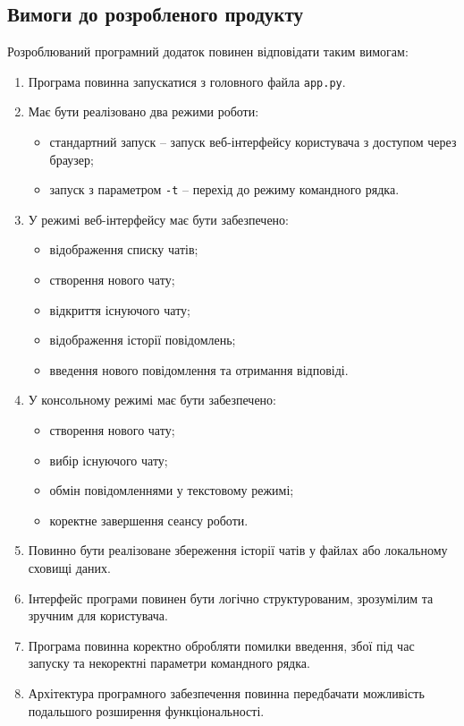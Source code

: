 \documentclass[12pt,a4paper]{article}
\begin{document}
    \subsection{Вимоги до розробленого продукту}

    Розроблюваний програмний додаток повинен відповідати таким вимогам:

    \begin{enumerate}
        \item Програма повинна запускатися з головного файла \texttt{app.py}.
        \item Має бути реалізовано два режими роботи:
        \begin{itemize}
            \item стандартний запуск -- запуск веб-інтерфейсу користувача з доступом через браузер;
            \item запуск з параметром \texttt{-t} -- перехід до режиму командного рядка.
        \end{itemize}
        \item У режимі веб-інтерфейсу має бути забезпечено:
        \begin{itemize}
            \item відображення списку чатів;
            \item створення нового чату;
            \item відкриття існуючого чату;
            \item відображення історії повідомлень;
            \item введення нового повідомлення та отримання відповіді.
        \end{itemize}
        \item У консольному режимі має бути забезпечено:
        \begin{itemize}
            \item створення нового чату;
            \item вибір існуючого чату;
            \item обмін повідомленнями у текстовому режимі;
            \item коректне завершення сеансу роботи.
        \end{itemize}
        \item Повинно бути реалізоване збереження історії чатів у файлах або локальному сховищі даних.
        \item Інтерфейс програми повинен бути логічно структурованим, зрозумілим та зручним для користувача.
        \item Програма повинна коректно обробляти помилки введення, збої під час запуску та некоректні параметри командного рядка.
        \item Архітектура програмного забезпечення повинна передбачати можливість подальшого розширення функціональності.
    \end{enumerate}
\end{document}
